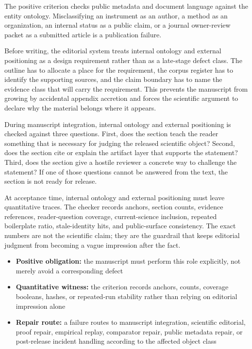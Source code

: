 The positive criterion checks public metadata and document language against the entity ontology. Misclassifying an instrument as an author, a method as an organization, an internal status as a public claim, or a journal owner-review packet as a submitted article is a publication failure.


Before writing, the editorial system treats internal ontology and external positioning as a design requirement rather than as a late-stage defect class. The outline has to allocate a place for the requirement, the corpus register has to identify the supporting sources, and the claim boundary has to name the evidence class that will carry the requirement. This prevents the manuscript from growing by accidental appendix accretion and forces the scientific argument to declare why the material belongs where it appears.


During manuscript integration, internal ontology and external positioning is checked against three questions. First, does the section teach the reader something that is necessary for judging the released scientific object? Second, does the section cite or explain the artifact layer that supports the statement? Third, does the section give a hostile reviewer a concrete way to challenge the statement? If one of those questions cannot be answered from the text, the section is not ready for release.


At acceptance time, internal ontology and external positioning must leave quantitative traces. The checker records anchors, section counts, evidence references, reader-question coverage, current-science inclusion, repeated boilerplate ratio, stale-identity hits, and public-surface consistency. The exact numbers are not the scientific claim; they are the guardrail that keeps editorial judgment from becoming a vague impression after the fact.


\begin{itemize}[leftmargin=1.8em]

\item \textbf{Positive obligation:} the manuscript must perform this role explicitly, not merely avoid a corresponding defect

\item \textbf{Quantitative witness:} the criterion records anchors, counts, coverage booleans, hashes, or repeated-run stability rather than relying on editorial impression alone

\item \textbf{Repair route:} a failure routes to manuscript integration, scientific editorial, proof repair, empirical replay, comparator repair, public metadata repair, or post-release incident handling according to the affected object class

\end{itemize}

